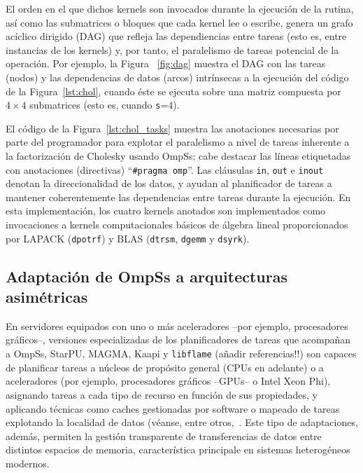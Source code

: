 El orden en el que dichos kernels son invocados durante la ejecución de la rutina, 
así como las submatrices o bloques que cada kernel lee o escribe, genera un grafo acíclico dirigido (DAG)
que refleja las dependiencias entre tareas (esto es, entre instancias de los kernels) y, por tanto,
el paralelismo de tareas potencial de la operación.
Por ejemplo, la Figura ~\ref{fig:dag} muestra el DAG con las tareas (nodos) y las dependencias de datos
(arcos) intrínsecas a la ejecución del código de la Figura~\ref{lst:chol}, cuando éste se ejecuta sobre
una matriz compuesta por $4 \times 4$ submatrices (esto es, cuando {\tt s}=4).  

El código de la Figura~\ref{lst:chol_tasks} muestra las anotaciones necesarias por parte del programador para explotar
el paralelismo a nivel de tareas inherente a la factorización de Cholesky usando OmpSs; cabe destacar las líneas etiquetadas
con  anotaciones (directivas) ``{\tt \#pragma omp}''.
Las cláusulas {\tt in}, {\tt out} e {\tt inout} denotan la direccionalidad de los datos, y ayudan al planificador
de tareas a mantener coherentemente las dependencias entre tareas durante la ejecución. 
En esta implementación, los cuatro kernels anotados son implementados como invocaciones a 
kernels computacionales básicos de álgebra lineal proporcionados por LAPACK
({\tt dpotrf}) y BLAS ({\tt dtrsm}, {\tt dgemm} y {\tt dsyrk}).



\subsection{Adaptación de OmpSs a arquitecturas asimétricas}
\label{s3:botlev}

En servidores equipados con uno o más aceleradores --por ejemplo, procesadores gráficos--, versiones especializadas de los
planificadores de tareas que acompañan a OmpSs, StarPU, MAGMA, Kaapi y {\tt libflame} (añadir referencias!!) son capaces
de planificar tareas a núcleos de propósito general (CPUs en adelante) o a aceleradores (por ejemplo, procesadores gráficos
--GPUs-- o Intel Xeon Phi), asignando tareas a cada tipo de recurso en función de sus propiedades, y aplicando técnicas
como caches gestionadas por software o mapeado de tareas explotando la localidad de datos (véanse, entre 
otros,~\cite{Quintana:2008:PMA,CPE:CPE1463,Augonnet:2011:SUP:1951453.1951454,5470941,Gautier:2013:XRS:2510661.2511383}. Este
tipo de adaptaciones, además, permiten la gestión transparente de transferencias de datos entre distintos espacios de 
memoria, característica principale en sistemas heterogéneos modernos.

